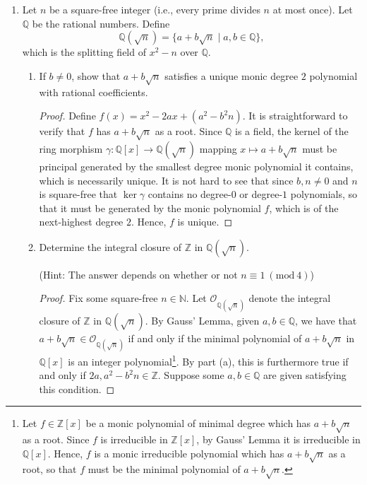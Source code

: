 \documentclass[10pt]{article}
\newcommand{\cO}{\mathcal O}
\newcommand{\bZ}{\mathbb{Z}}
\newcommand{\bN}{\mathbb{N}}
\newcommand{\bQ}{\mathbb{Q}}
\newcommand{\1}{\mbf 1}
\newcommand{\2}{\mbf 2}
\newcommand{\3}{\mbf 3}
\newcommand{\4}{\mbf 4}
\newcommand{\5}{\mbf 5}
\newcommand{\6}{\mbf 6}
\newcommand{\7}{\mbf 7}
\newcommand{\8}{\mbf 8}
\newcommand{\9}{\mbf 9}
\newcommand{\0}{\mbf 0}
\renewcommand{\(}{\left(}
\renewcommand{\)}{\right)}
\begin{document}
\begin{enumerate}[label=(\arabic*)]
    \item Let $n$ be a square-free integer (i.e., every prime divides $n$ at most once). Let $\bQ$ be the rational numbers. Define
    \[\bQ(\sqrt n)=\{a+b\sqrt n\mid a,b\in\bQ\},\]
    which is the splitting field of $x^2-n$ over $\bQ$.
    \begin{enumerate}[label=(\alph*)]
        \item If $b\neq0$, show that $a+b\sqrt n$ satisfies a unique monic degree $2$ polynomial with rational coefficients.
        \begin{proof}
            Define $f(x)=x^2-2ax+(a^2-b^2n)$. It is straightforward to verify that $f$ has $a+b\sqrt n$ as a root. Since $\bQ$ is a field, the kernel of the ring morphism $\gamma:\bQ[x]\to\bQ(\sqrt n)$ mapping $x\mapsto a+b\sqrt n$ must be principal generated by the smallest degree monic polynomial it contains, which is necessarily unique. It is not hard to see that since $b,n\neq 0$ and $n$ is square-free that $\ker\gamma$ contains no degree-$0$ or degree-$1$ polynomials, so that it must be generated by the monic polynomial $f$, which is of the next-highest degree $2$. Hence, $f$ is unique.
        \end{proof}
        \item Determine the integral closure of $\bZ$ in $\bQ(\sqrt n)$.
        
        (Hint: The answer depends on whether or not $n\equiv 1\ (\mathrm{mod}\ 4)$)
        \begin{proof}
            Fix some square-free $n\in\bN$. Let $\mathcal O_{\bQ(\sqrt n)}$ denote the integral closure of $\bZ$ in $\bQ(\sqrt n)$. By Gauss' Lemma, given $a,b\in\bQ$, we have that $a+b\sqrt n\in\cO_{\bQ(\sqrt n)}$ if and only if the minimal polynomial of $a+b\sqrt n$ in $\bQ[x]$ is an integer polynomial\footnote{Let $f\in\bZ[x]$ be a monic polynomial of minimal degree which has $a+b\sqrt n$ as a root. Since $f$ is irreducible in $\bZ[x]$, by Gauss' Lemma it is irreducible in $\bQ[x]$. Hence, $f$ is a monic irreducible polynomial which has $a+b\sqrt n$ as a root, so that $f$ must be the minimal polynomial of $a+b\sqrt n$.}. By part (a), this is furthermore true if and only if $2a,a^2-b^2n\in\bZ$. Suppose some $a,b\in\bQ$ are given satisfying this condition.
%


\end{proof}
\end{enumerate}
\end{enumerate}
\end{document}
